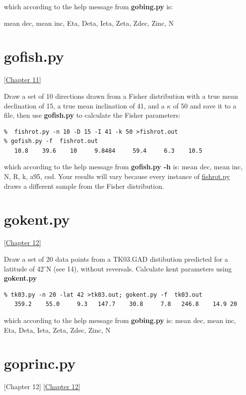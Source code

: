 \documentclass[11pt]{book}
\begin{document}
{{{\noindent  which according to the help message from {\bf gobing.py} is:  

mean dec, mean inc, Eta, Deta, Ieta, Zeta, Zdec, Zinc, N


\section {\bf gofish.py} 
 \href{http://Webbook2.html#Fisher_statistics}{[Chapter 11]}
 
 Draw a set of 10 directions drawn  from a Fisher distribution with a true mean declination of 15, a true mean inclination of 41, and a $\kappa$ of  50 and save it to a file, then use {\bf gofish.py} to calculate the Fisher parameters:

\begin{verbatim}
%  fishrot.py -n 10 -D 15 -I 41 -k 50 >fishrot.out
% gofish.py -f  fishrot.out 
   10.8    39.6    10     9.8484     59.4     6.3    10.5
   \end{verbatim}
   
\noindent     which according to the help message from {\bf gofish.py -h} is:   mean dec, mean inc, N, R, k, a95, csd.  Your results will vary because every instance of \href{#fishrot.py}{fishrot.py} draws a different sample from the Fisher distribution.   

%

\section {\bf gokent.py} 
 \href{http://Webbook2.html#Beyond_Fisher_statistics}{[Chapter 12]}

Draw a set of 20 data points  from a TK03.GAD distibution predicted for a latitude of 42$^{\circ}$N (see  14), without  reversals.  Calculate kent parameters using {\bf gokent.py} 

\begin{verbatim}
% tk03.py -n 20 -lat 42 >tk03.out; gokent.py -f  tk03.out
   359.2    55.0     9.3   147.7    30.8     7.8   246.8    14.9 20
\end{verbatim}

\noindent  which according to the help message from {\bf gobing.py} is:   mean dec, mean inc, Eta, Deta, Ieta, Zeta, Zdec, Zinc, N


\section {\bf goprinc.py} [Chapter 12]
 \href{http://Webbook2.html#Beyond_Fisher_statistics}{[Chapter 12]}

}}}
\end{document}
